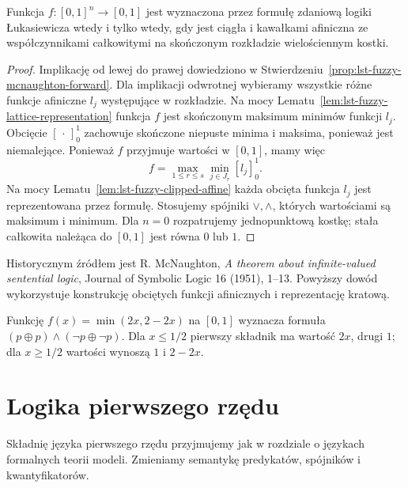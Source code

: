 \begin{twierdzenie}\label{thm:lst-fuzzy-mcnaughton}
Funkcja $f:[0,1]^n\to[0,1]$ jest wyznaczona przez formułę
zdaniową logiki Łukasiewicza wtedy i tylko wtedy, gdy jest
ciągła i kawałkami afiniczna ze współczynnikami całkowitymi
na skończonym rozkładzie wielościennym kostki.
\end{twierdzenie}
\begin{proof}
Implikację od lewej do prawej dowiedziono w
Stwierdzeniu~\ref{prop:lst-fuzzy-mcnaughton-forward}.
Dla implikacji odwrotnej wybieramy wszystkie różne funkcje afiniczne
$l_j$ występujące w rozkładzie. Na mocy
Lematu~\ref{lem:lst-fuzzy-lattice-representation} funkcja $f$ jest
skończonym maksimum minimów funkcji $l_j$.
Obcięcie $[\,\cdot\,]_0^1$ zachowuje skończone niepuste minima i
maksima, ponieważ jest niemalejące. Ponieważ $f$ przyjmuje
wartości w $[0,1]$, mamy więc
\[
 f=\max_{1\leq r\leq s}\min_{j\in J_r}[l_j]_0^1.
\]
Na mocy Lematu~\ref{lem:lst-fuzzy-clipped-affine} każda obcięta
funkcja $l_j$ jest reprezentowana przez formułę. Stosujemy
spójniki $\vee,\wedge$, których wartościami są maksimum i minimum.
Dla $n=0$ rozpatrujemy jednopunktową kostkę; stała całkowita
należąca do $[0,1]$ jest równa $0$ lub $1$.
\end{proof}
Historycznym źródłem jest R. McNaughton, \emph{A theorem about
infinite-valued sentential logic}, Journal of Symbolic Logic
16 (1951), 1--13. Powyższy dowód wykorzystuje konstrukcję
obciętych funkcji afinicznych i reprezentację kratową.

\begin{przyklad}\label{ex:lst-fuzzy-mcnaughton-tent}
Funkcję $f(x)=\min(2x,2-2x)$ na $[0,1]$ wyznacza formuła
$(p\oplus p)\wedge(\neg p\oplus\neg p)$.
Dla $x\leq1/2$ pierwszy składnik ma wartość $2x$, drugi $1$;
dla $x\geq1/2$ wartości wynoszą $1$ i $2-2x$.
\begin{center}
\end{center}
\end{przyklad}

\section{Logika pierwszego rzędu}
Składnię języka pierwszego rzędu przyjmujemy jak w rozdziale
o językach formalnych teorii modeli. Zmieniamy semantykę
predykatów, spójników i kwantyfikatorów.

